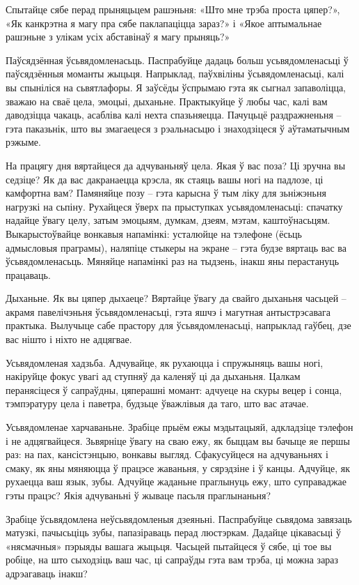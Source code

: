 Спытайце сябе перад прыняцьцем рашэньня: «Што мне трэба проста цяпер?», «Як канкрэтна я магу пра сябе паклапаціцца зараз?» і «Якое аптымальнае рашэньне з улікам усіх абставінаў я магу прыняць?»

Паўсядзённая ўсьвядомленасьць. Паспрабуйце дадаць больш усьвядомленасьці ў паўсядзённыя моманты жыцьця. Напрыклад, паўхвіліны ўсьвядомленасьці, калі вы спыніліся на сьвятлафоры. Я заўсёды ўспрымаю гэта як сыгнал запаволіцца, зважаю на сваё цела, эмоцыі, дыханьне. Практыкуйце ў любы час, калі вам даводзіцца чакаць, асабліва калі нехта спазьняецца. Пачуцьцё раздражненьня – гэта паказьнік, што вы змагаецеся з рэальнасьцю і знаходзіцеся ў аўтаматычным рэжыме.

На працягу дня вяртайцеся да адчуваньняў цела. Якая ў вас поза? Ці зручна вы седзіце? Як да вас дакранаецца крэсла, як стаяць вашы ногі на падлозе, ці камфортна вам? Памяняйце позу – гэта карысна ў тым ліку для зьніжэньня нагрузкі на сьпіну. Рухайцеся ўверх па прыступках усьвядомленасьці: спачатку надайце ўвагу целу, затым эмоцыям, думкам, дзеям, мэтам, каштоўнасьцям. Выкарыстоўвайце вонкавыя напамінкі: усталюйце на тэлефоне (ёсьць адмысловыя праграмы), наляпіце стыкеры на экране – гэта будзе вяртаць вас ва ўсьвядомленасьць. Мяняйце напамінкі раз на тыдзень, інакш яны перастануць працаваць.

Дыханьне. Як вы цяпер дыхаеце? Вяртайце ўвагу да свайго дыханьня часьцей – акрамя павелічэньня ўсьвядомленасьці, гэта яшчэ і магутная антыстрэсавага практыка. Вылучыце сабе прастору для ўсьвядомленасьці, напрыклад гаўбец, дзе вас нішто і ніхто не адцягвае.

Усьвядомленая хадзьба. Адчувайце, як рухаюцца і спружыняць вашы ногі, накіруйце фокус увагі ад ступняў да каленяў ці да дыханьня. Цалкам перанясіцеся ў сапраўдны, цяперашні момант: адчуеце на скуры вецер і сонца, тэмпэратуру цела і паветра, будзьце ўважлівыя да таго, што вас атачае.

Усьвядомленае харчаваньне. Зрабіце прыём ежы мэдытацыяй, адкладзіце тэлефон і не адцягвайцеся. Зьвярніце ўвагу на сваю ежу, як быццам вы бачыце яе першы раз: на пах, кансістэнцыю, вонкавы выгляд. Сфакусуйцеся на адчуваньнях і смаку, як яны мяняюцца ў працэсе жаваньня, у сярэдзіне і ў канцы. Адчуйце, як рухаецца ваш язык, зубы. Адчуйце жаданьне праглынуць ежу, што суправаджае гэты працэс? Якія адчуваньні ў жываце пасьля праглынаньня?

Зрабіце ўсьвядомлена неўсьвядомленыя дзеяньні. Паспрабуйце сьвядома завязаць матузкі, пачысьціць зубы, папазіраваць перад люстэркам. Дадайце цікавасьці ў «нясмачныя» пэрыяды вашага жыцьця. Часьцей пытайцеся ў сябе, ці тое вы робіце, на што сыходзіць ваш час, ці сапраўды гэта вам трэба, ці можна зараз адрэагаваць інакш?

